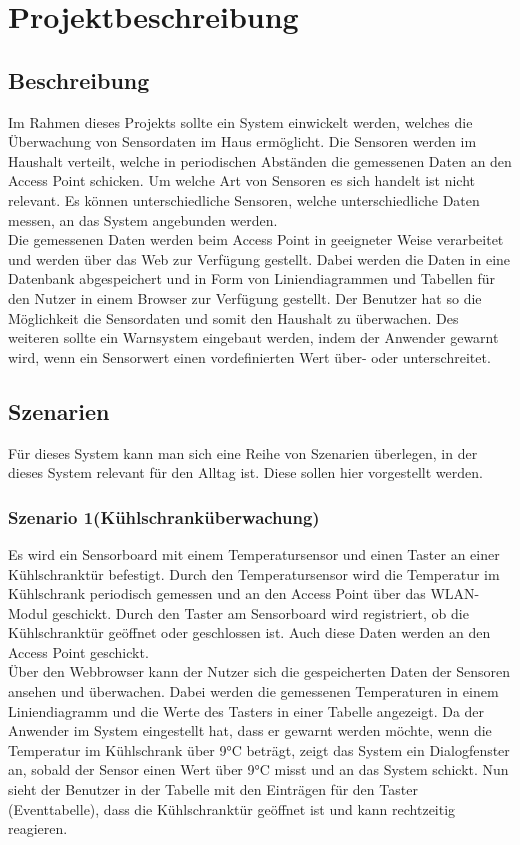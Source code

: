 \documentclass[12pt,a4paper,twoside]{article}
\newcommand{\labelSec}[1]{\label{sec:#1}}
\begin{document}
\section{Projektbeschreibung}\labelSec{abschnitt}

\subsection{Beschreibung}

Im Rahmen dieses Projekts sollte ein System einwickelt werden, welches die Überwachung von Sensordaten im Haus ermöglicht. Die Sensoren werden im Haushalt verteilt, welche in periodischen Abständen die gemessenen Daten an den Access Point schicken. Um welche Art von Sensoren es sich handelt ist nicht relevant. Es können unterschiedliche Sensoren, welche unterschiedliche Daten messen, an das System angebunden werden.\\
Die gemessenen Daten werden beim Access Point in geeigneter Weise verarbeitet und werden über das Web zur Verfügung gestellt. Dabei werden die Daten in eine Datenbank abgespeichert und in Form von Liniendiagrammen und Tabellen für den Nutzer in einem Browser zur Verfügung gestellt. Der Benutzer hat so die Möglichkeit die Sensordaten und somit den Haushalt zu überwachen.
Des weiteren sollte ein Warnsystem eingebaut werden, indem der Anwender gewarnt wird, wenn ein Sensorwert einen vordefinierten Wert über- oder unterschreitet.

\subsection{Szenarien}
Für dieses System kann man sich eine Reihe von Szenarien überlegen, in der dieses System relevant für den Alltag ist. Diese sollen hier vorgestellt werden.

\subsubsection{Szenario 1(Kühlschranküberwachung)}
Es wird ein Sensorboard mit einem Temperatursensor und einen Taster an einer Kühlschranktür befestigt. Durch den Temperatursensor wird die Temperatur im Kühlschrank periodisch gemessen und an den Access Point über das WLAN-Modul geschickt. Durch den Taster am Sensorboard wird registriert, ob die Kühlschranktür geöffnet oder geschlossen ist. Auch diese Daten werden an den Access Point geschickt. \\
Über den Webbrowser kann der Nutzer sich die gespeicherten Daten der Sensoren ansehen und überwachen. Dabei werden die gemessenen Temperaturen in einem Liniendiagramm und die Werte des Tasters in einer Tabelle angezeigt. Da der Anwender im System eingestellt hat, dass er gewarnt werden möchte, wenn die Temperatur im Kühlschrank über 9°C beträgt, zeigt das System ein Dialogfenster an, sobald der Sensor einen Wert über 9°C misst und an das System schickt. Nun sieht der Benutzer in der Tabelle mit den Einträgen für den Taster (Eventtabelle), dass die Kühlschranktür geöffnet ist und kann rechtzeitig reagieren.
\end{document}
